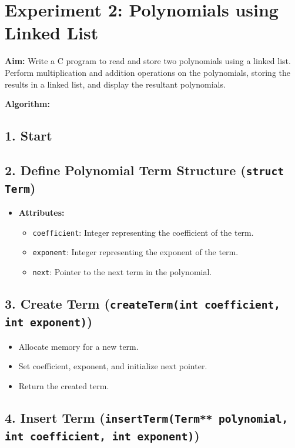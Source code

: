 \documentclass{article}
\begin{document}
\clearpage
{}
\section{Experiment 2: Polynomials using Linked List}
\textbf{Aim:} Write a C program to read and store two polynomials using a linked list. Perform multiplication and addition operations on the polynomials, storing the results in a linked list, and display the resultant polynomials.

\textbf{Algorithm:}
\subsection*{1. Start}

\subsection*{2. Define Polynomial Term Structure (\texttt{struct Term})}

\begin{itemize}
  \item \textbf{Attributes:}
    \begin{itemize}
      \item \texttt{coefficient}: Integer representing the coefficient of the term.
      \item \texttt{exponent}: Integer representing the exponent of the term.
      \item \texttt{next}: Pointer to the next term in the polynomial.
    \end{itemize}
\end{itemize}

\subsection*{3. Create Term (\texttt{createTerm(int coefficient, int exponent)})}

\begin{itemize}
  \item Allocate memory for a new term.
  \item Set coefficient, exponent, and initialize next pointer.
  \item Return the created term.
\end{itemize}

\subsection*{4. Insert Term (\texttt{insertTerm(Term** polynomial, int coefficient, int exponent)})}
\end{document}
